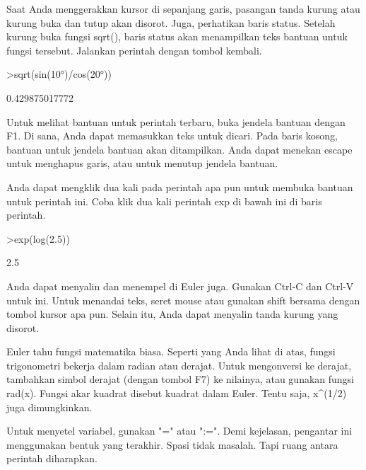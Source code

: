 \documentclass[a4paper,10pt]{article}
\begin{document}
\begin{eulernotebook}
\begin{eulercomment}
Saat Anda menggerakkan kursor di sepanjang garis, pasangan tanda
kurung atau kurung buka dan tutup akan disorot. Juga, perhatikan baris
status. Setelah kurung buka fungsi sqrt(), baris status akan
menampilkan teks bantuan untuk fungsi tersebut. Jalankan perintah
dengan tombol kembali.
\end{eulercomment}
\begin{eulerprompt}
>sqrt(sin(10°)/cos(20°))
\end{eulerprompt}
\begin{euleroutput}
  0.429875017772
\end{euleroutput}
\begin{eulercomment}
Untuk melihat bantuan untuk perintah terbaru, buka jendela bantuan
dengan F1. Di sana, Anda dapat memasukkan teks untuk dicari. Pada
baris kosong, bantuan untuk jendela bantuan akan ditampilkan. Anda
dapat menekan escape untuk menghapus garis, atau untuk menutup jendela
bantuan.

Anda dapat mengklik dua kali pada perintah apa pun untuk membuka
bantuan untuk perintah ini. Coba klik dua kali perintah exp di bawah
ini di baris perintah.
\end{eulercomment}
\begin{eulerprompt}
>exp(log(2.5))
\end{eulerprompt}
\begin{euleroutput}
  2.5
\end{euleroutput}
\begin{eulercomment}
Anda dapat menyalin dan menempel di Euler juga. Gunakan Ctrl-C dan
Ctrl-V untuk ini. Untuk menandai teks, seret mouse atau gunakan shift
bersama dengan tombol kursor apa pun. Selain itu, Anda dapat menyalin
tanda kurung yang disorot.
\end{eulercomment}
\begin{eulercomment}

\end{eulercomment}
\begin{eulercomment}
Euler tahu fungsi matematika biasa. Seperti yang Anda lihat di atas,
fungsi trigonometri bekerja dalam radian atau derajat. Untuk
mengonversi ke derajat, tambahkan simbol derajat (dengan tombol F7) ke
nilainya, atau gunakan fungsi rad(x). Fungsi akar kuadrat disebut
kuadrat dalam Euler. Tentu saja, x\textasciicircum{}(1/2) juga dimungkinkan.

Untuk menyetel variabel, gunakan "=" atau ":=". Demi kejelasan,
pengantar ini menggunakan bentuk yang terakhir. Spasi tidak masalah.
Tapi ruang antara perintah diharapkan.


\end{eulercomment}
\end{eulernotebook}
\end{document}
